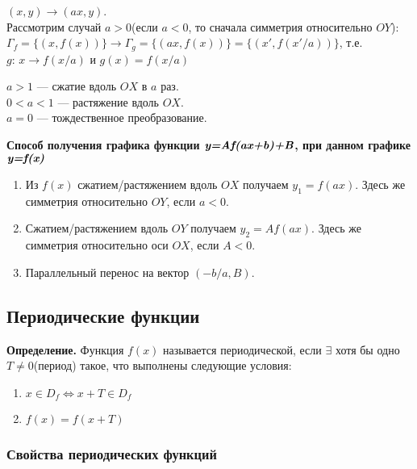 \documentclass{article}
\begin{document}
\begin{enumerate}
        \((x,y)\rightarrow (ax,y)\).\\
        Рассмотрим случай \(a>0\)(если \(a<0\), то сначала симметрия относительно \(OY\)):\\
        \(\Gamma_f=\{(x,f(x))\}\rightarrow \Gamma_g=\{(ax,f(x))\}=\{(x',f(x'/a))\}\), т.е.\\
        \(g\): \(x \rightarrow f(x/a)\) и \(g(x)=f(x/a)\)

        \(a>1\) --- сжатие вдоль \(OX\) в \(a\) раз.\\
        \(0<a<1\) --- растяжение вдоль \(OX\).\\
        \(a=0\) --- тождественное преобразование.
    \end{enumerate}
    
    \textbf{Способ получения графика функции \(\textit{\textbf{y=Af(ax+b)+B}}\), при данном графике \(\textit{\textbf{y=f(x)}}\)}

    \begin{enumerate}
        \item Из \(f(x)\) сжатием/растяжением вдоль \(OX\) получаем \(y_1=f(ax)\). Здесь же симметрия относительно \(OY\), если \(a<0\).
        \item Сжатием/растяжением вдоль \(OY\) получаем \(y_2=Af(ax)\). Здесь же симметрия относительно оси \(OX\), если \(A<0\).
        \item Параллельный перенос на вектор \((-b/a, B)\).
    \end{enumerate}

    \subsection{Периодические функции}
    
    \textbf{Определение.} Функция \(f(x)\) называется периодической, если \(\exists\) хотя бы одно \(T \not = 0\)(период) такое, что выполнены следующие условия:
    \begin{enumerate}
        \item \(x \in D_f \Leftrightarrow x + T \in D_f\)
        \item \(f(x)=f(x+T)\)
    \end{enumerate}

    \subsubsection{Свойства периодических функций}
\end{document}
